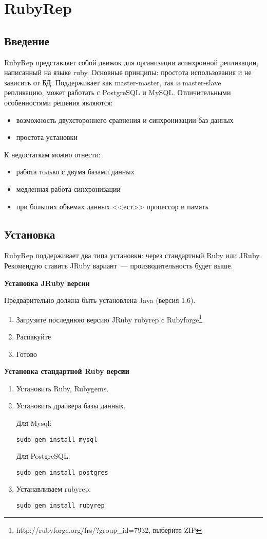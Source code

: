 \section{RubyRep}
\subsection{Введение}
RubyRep представляет собой движок для организации асинхронной репликации, написанный на языке ruby. 
Основные принципы: простота использования и не зависить от БД. 
Поддерживает как master-master, так и master-slave репликацию, может работать с PostgreSQL и MySQL.
Отличительными особенностями решения являются:
\begin{itemize}
\item возможность двухстороннего сравнения и синхронизации баз данных
\item простота установки
\end{itemize}
К недостаткам можно отнести:
\begin{itemize}
\item работа только с двумя базами данных
\item медленная работа синхронизации 
\item при больших обьемах данных <<ест>> процессор и память
\end{itemize}


\subsection{Установка}
RubyRep поддерживает два типа установки: через стандартный Ruby или JRuby. 
Рекомендую ставить JRuby вариант~--- производительность будет выше.

\textbf{Установка JRuby версии}

Предварительно должна быть установлена Java (версия 1.6).
\begin{enumerate}
 \item Загрузите последнюю версию JRuby rubyrep c Rubyforge\footnote{http://rubyforge.org/frs/?group\_id=7932, выберите ZIP}.
 \item Распакуйте
 \item Готово
\end{enumerate}

\textbf{Установка стандартной Ruby версии}
\begin{enumerate}
\item Установить Ruby, Rubygems.
\item Установить драйвера базы данных.

Для Mysql: 
\begin{verbatim}
sudo gem install mysql
\end{verbatim}

Для PostgreSQL:
\begin{verbatim}
sudo gem install postgres
\end{verbatim}

\item Устанавливаем rubyrep:
\begin{verbatim}
sudo gem install rubyrep
\end{verbatim}
\end{enumerate}


